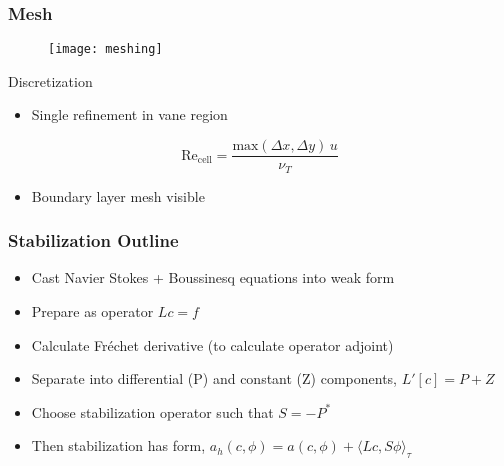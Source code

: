 \documentclass[mathserif]{beamer}
\begin{document}
%
%
\begin{frame}
 \frametitle{Mesh}
 
 \begin{figure}[htb]
  \centering
  \texttt{[image: meshing]}
 \end{figure}
 
 \begin{block}{Discretization}
  \begin{itemize}
   \item Single refinement in vane region
  \end{itemize}
\begin{equation*}
	  \text{Re}_\text{cell} = \frac{\text{max}(\Delta x,\Delta y)
	   \, u}{\nu_T}
\end{equation*}	
  \begin{itemize}
   \item Boundary layer mesh visible
  \end{itemize}
 \end{block}
\end{frame}

%
%
\begin{frame}
\frametitle{Stabilization Outline}

\begin{itemize}
 \item Cast Navier Stokes + Boussinesq equations into weak form
 \item Prepare as operator $Lc=f$
 \item Calculate Fr\'echet derivative (to calculate operator adjoint)
 \item Separate into differential (P) and constant (Z) components,
       $L'[c] = P + Z$
 \item Choose stabilization operator such that $S = -P^*$
 \item Then stabilization has form, $a_h(c,\phi) = a(c,\phi) + \langle
       Lc,S\phi \rangle_\tau$
\end{itemize}
\end{frame}
\end{document}
